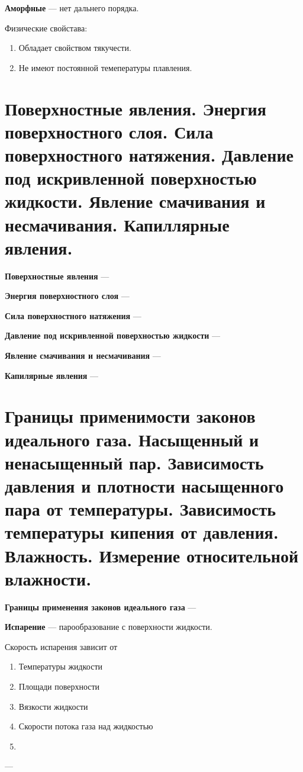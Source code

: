 \documentclass{report}
\begin{document}
{\bf Аморфные} ---
нет дальнего порядка.

Физические свойстава:
\begin{enumerate}
  \item Обладает свойством тякучести.
  \item Не имеют постоянной темепературы плавления.
\end{enumerate}



\part{Поверхностные явления.
Энергия поверхностного слоя.
Сила поверхностного натяжения.
Давление под искривленной поверхностью жидкости.
Явление смачивания и несмачивания.
Капиллярные явления.}

{\bf Поверхностные явления} ---

{\bf Энергия поверхностного слоя} ---

{\bf Сила поверхностного натяжения} ---

{\bf Давление под искривленной поверхностью жидкости} ---

{\bf Явление смачивания и несмачивания} ---

{\bf Капилярные явления} ---



\part{Границы применимости законов идеального газа. 
Насыщенный и ненасыщенный пар. 
Зависимость давления и плотности насыщенного пара от температуры. 
Зависимость температуры кипения от давления. 
Влажность.
Измерение относительной влажности.}

{\bf Границы применения законов идеального газа} ---

{\bf Испарение} ---
парообразование с поверхности жидкости.

Скорость испарения зависит от 
\begin{enumerate}
  \item Температуры жидкости
  \item Площади поверхности
  \item Вязкости жидкости
  \item Скорости потока газа над жидкостью
  \item 
\end{enumerate}

{\bf } ---
\end{document}
